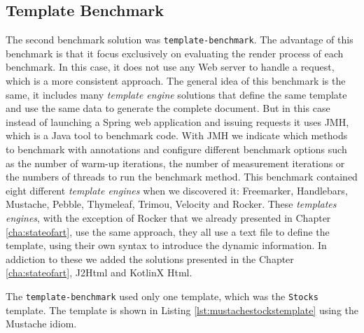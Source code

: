 \subsection{Template Benchmark}
\label{sec:templatebenchmark}

The second benchmark solution was \texttt{template-benchmark}\cite{templatebenchmark}. The advantage of this benchmark is that it focus exclusively on evaluating the render process of each benchmark. In this case, it does not use any Web server to handle a request, which is a more consistent approach. The general idea of this benchmark is the same, it includes many \textit{template engine} solutions that define the same template and use the same data to generate the complete document. But in this case instead of launching a Spring web application and issuing requests it uses \ac{JMH}\cite{jmh}, which is a Java tool to benchmark code. With \ac{JMH} we indicate which methods to benchmark with annotations and configure different benchmark options such as the number of warm-up iterations, the number of measurement iterations or the numbers of threads to run the benchmark method. This benchmark contained eight different \textit{template engines} when we discovered it: Freemarker\cite{freemarker}, Handlebars\cite{handlebars}, Mustache\cite{mustache}, Pebble\cite{pebble}, Thymeleaf\cite{thymeleaf}, Trimou\cite{trimou}, Velocity\cite{velocity} and Rocker\cite{rocker}. These \textit{templates engines}, with the exception of Rocker that we already presented in Chapter \ref{cha:stateofart}, use the same approach, they all use a text file to define the template, using their own syntax to introduce the dynamic information. In addiction to these we added the solutions presented in the Chapter \ref{cha:stateofart}, J2Html and KotlinX Html. 

\noindent
The \texttt{template-benchmark} used only one template, which was the \texttt{Stocks} template. The template is shown in Listing \ref{lst:mustachestockstemplate} using the Mustache idiom.

\bigskip


